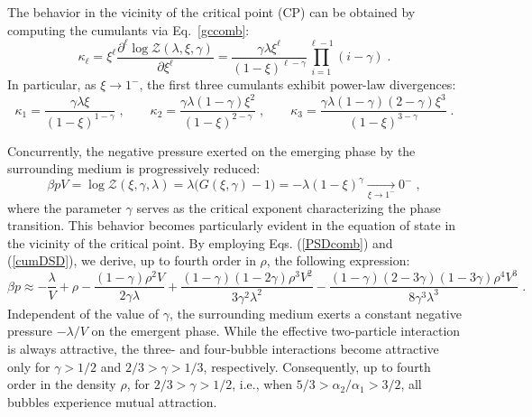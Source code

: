 \documentclass[a4paper,12pt]{amsart}
\theoremstyle{definition}
\theoremstyle{remark}
\begin{document}
The behavior in the vicinity of the critical point (CP) can be obtained by computing the cumulants via Eq.~\ref{gccomb}:
\begin{equation}\label{cumDSD}
  \kappa_{\ell}
  =\xi^{\ell}\frac{\partial^{\ell}\log \mathcal{Z}(\lambda, \xi, \gamma)}{\partial\xi^{\ell}}
  = \frac{\gamma \lambda \xi^{\ell}}{(1-\xi )^{\ell-\gamma}}
 \prod_{i=1}^{\ell -1}(i-\gamma)
  \;.
\end{equation}
In particular, as $\xi \to 1^{-}$, the first three cumulants exhibit power-law divergences:
\begin{equation}
\kappa_1= \frac{\gamma \lambda \xi}{ (1-\xi )^{1-\gamma }}\;,\qquad 
\kappa_2=\frac{\gamma\lambda (1-\gamma)   \xi ^2}{  (1-\xi )^{2-\gamma}}\;,\qquad 
\kappa_3=\frac{\gamma\lambda (1-\gamma) (2-\gamma)   \xi ^3}{ (1-\xi )^{3-\gamma}}\;.
\end{equation}

Concurrently, the negative pressure exerted on the emerging phase by the surrounding medium is progressively reduced:
\[
\beta p V =\log \mathcal{Z}(\xi, \gamma,\lambda)
=\lambda \bigl(G(\xi,\gamma)-1\bigr) =
-\lambda(1-\xi)^{\gamma} \xrightarrow[\xi \to 1^{-}]{} 0^{-}\;,
\]
where the parameter $\gamma$ serves as the critical exponent characterizing the phase transition. This behavior becomes particularly evident in the equation of state in the vicinity of the critical point. By employing Eqs. (\ref{PSDcomb}) and (\ref{cumDSD}), we derive, up to fourth order in $\rho$, the following expression:
\begin{equation}
\beta p \approx 
-\frac{\lambda}{V} +\rho -\frac{(1\!-\!\gamma) \rho^2 V}{2 \gamma  \lambda }
+\frac{(1\!-\!\gamma) (1\!-\!2 \gamma) \rho^3 V^2}{3 \gamma ^2 \lambda ^2}
-\frac{(1\!-\!\gamma) (2\!-\!3 \gamma ) (1\!-\!3 \gamma) \rho^4 V^3}{8 \gamma ^3 \lambda ^3}\;.
\end{equation}
Independent of the value of $\gamma$, the surrounding medium exerts a constant negative pressure $-\lambda/V$ on the emergent phase. While the effective two-particle interaction is always attractive, the three- and four-bubble interactions become attractive only for $\gamma>1/2$ and $2/3>\gamma>1/3$, respectively. Consequently, up to fourth order in the density $\rho$, for $2/3>\gamma>1/2$, i.e., when $5/3>\alpha_2/\alpha_1>3/2$, all bubbles experience mutual attraction.
\end{document}
